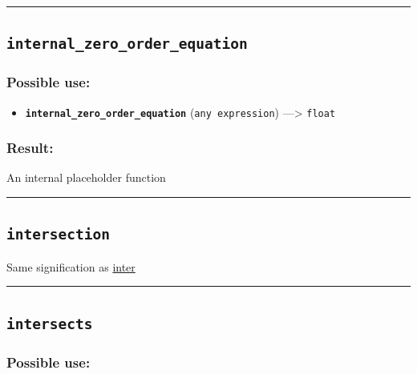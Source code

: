 \documentclass[]{book}
\providecommand{\tightlist}{%
  \setlength{\itemsep}{0pt}\setlength{\parskip}{0pt}}
\theoremstyle{definition}
\theoremstyle{definition}
\theoremstyle{definition}
\theoremstyle{remark}
\begin{document}
\begin{center}\rule{0.5\linewidth}{\linethickness}\end{center}

\subsection{\texorpdfstring{\texttt{internal\_zero\_order\_equation}}{internal\_zero\_order\_equation}}\label{internal_zero_order_equation}

\subsubsection{Possible use:}\label{possible-use-281}

\begin{itemize}
\tightlist
\item
  \textbf{\texttt{internal\_zero\_order\_equation}}
  (\texttt{any\ expression}) ---\textgreater{} \texttt{float}
\end{itemize}

\subsubsection{Result:}\label{result-271}

An internal placeholder function

\begin{center}\rule{0.5\linewidth}{\linethickness}\end{center}

\subsection{\texorpdfstring{\texttt{intersection}}{intersection}}\label{intersection}

Same signification as \href{operators-i-to-m.html\#inter}{inter}

\begin{center}\rule{0.5\linewidth}{\linethickness}\end{center}

\subsection{\texorpdfstring{\texttt{intersects}}{intersects}}\label{intersects}

\subsubsection{Possible use:}\label{possible-use-282}
\end{document}
